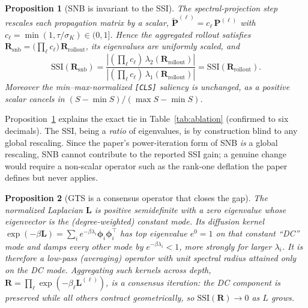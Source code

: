 \documentclass[11pt]{article}
\newcommand{\Lap}{\mathbf{L}}
\newcommand{\Pm}{\mathbf{P}}
\newcommand{\Pt}{\tilde{\mathbf{P}}}
\newcommand{\R}{\mathbf{R}}
\newcommand{\SSI}{\mathrm{SSI}}
\newtheorem{proposition}{Proposition}
\begin{document}
\begin{proposition}[SNB is invariant to the SSI]
\label{prop:snb}
The spectral-projection step rescales each propagation matrix by a scalar,
$\Pt^{(\ell)}=c_\ell\,\Pm^{(\ell)}$ with $c_\ell=\min(1,\tau/\sigma_K)\in(0,1]$.
Hence the aggregated rollout satisfies
$\R_{\mathrm{snb}}=\big(\prod_{\ell}c_\ell\big)\,\R_{\mathrm{rollout}}$, its
eigenvalues are uniformly scaled, and
\[
\SSI(\R_{\mathrm{snb}})
=\frac{|(\prod_\ell c_\ell)\,\lambda_2(\R_{\mathrm{rollout}})|}
       {|(\prod_\ell c_\ell)\,\lambda_1(\R_{\mathrm{rollout}})|}
=\SSI(\R_{\mathrm{rollout}}).
\]
Moreover the min--max-normalized \texttt{[CLS]} saliency is unchanged, as a
positive scalar cancels in $(S-\min S)/(\max S-\min S)$.
\end{proposition}

Proposition~\ref{prop:snb} explains the exact tie in Table~\ref{tab:ablation}
(confirmed to six decimals). The SSI, being a \emph{ratio} of eigenvalues, is by
construction blind to any global rescaling. Since the paper's power-iteration
form of SNB \emph{is} a global rescaling, SNB cannot contribute to the reported
SSI gain; a genuine change would require a non-scalar operator such as the
rank-one deflation the paper defines but never applies.

\begin{proposition}[GTS is a consensus operator that closes the gap]
\label{prop:gts}
The normalized Laplacian $\Lap$ is positive semidefinite with a zero eigenvalue
whose eigenvector is the (degree-weighted) constant mode. Its diffusion kernel
$\exp(-\beta\Lap)=\sum_i e^{-\beta\lambda_i}\bm{\phi}_i\bm{\phi}_i^{\top}$ has
top eigenvalue $e^{0}=1$ on that constant ``DC'' mode and damps every other mode
by $e^{-\beta\lambda_i}<1$, \emph{more} strongly for larger $\lambda_i$. It is
therefore a low-pass (averaging) operator with unit spectral radius attained
only on the DC mode. Aggregating such kernels across depth,
$\R=\prod_\ell \exp(-\beta_\ell\Lap^{(\ell)})$, is a consensus iteration: the DC
component is preserved while all others contract geometrically, so
$\SSI(\R)\to 0$ as $L$ grows.
\end{proposition}
\end{document}
